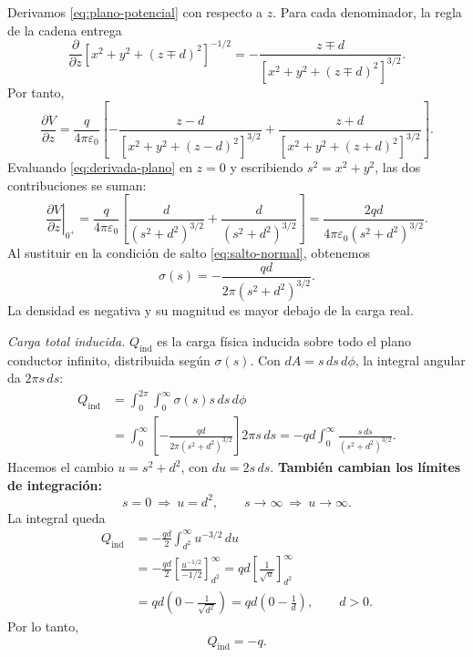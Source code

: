 \documentclass[11pt]{article}
\begin{document}
Derivamos \eqref{eq:plano-potencial} con respecto a $z$. Para cada
denominador, la regla de la cadena entrega
\[
 \frac{\partial}{\partial z}
 [x^2+y^2+(z\mp d)^2]^{-1/2}
 =-\frac{z\mp d}{[x^2+y^2+(z\mp d)^2]^{3/2}}.
\]
Por tanto,
\begin{equation}
 \frac{\partial V}{\partial z}
 =\frac{q}{4\pi\varepsilon_0}
 \left[-\frac{z-d}{[x^2+y^2+(z-d)^2]^{3/2}}
       +\frac{z+d}{[x^2+y^2+(z+d)^2]^{3/2}}\right].
 \label{eq:derivada-plano}
\end{equation}
Evaluando \eqref{eq:derivada-plano} en $z=0$ y escribiendo
$s^2=x^2+y^2$, las dos contribuciones se suman:
\[
 \left.\frac{\partial V}{\partial z}\right|_{0^+}
 =\frac{q}{4\pi\varepsilon_0}
 \left[\frac{d}{(s^2+d^2)^{3/2}}
       +\frac{d}{(s^2+d^2)^{3/2}}\right]
 =\frac{2qd}{4\pi\varepsilon_0(s^2+d^2)^{3/2}}.
\]
Al sustituir en la condición de salto \eqref{eq:salto-normal}, obtenemos
\begin{equation}
 \boxed{\sigma(s)=-\frac{qd}{2\pi(s^2+d^2)^{3/2}}.}
 \label{eq:plano-sigma}
\end{equation}
La densidad es negativa y su magnitud es mayor debajo de la carga real.

\textit{Carga total inducida.} $Q_{\mathrm{ind}}$ es la carga física
inducida sobre todo el plano conductor infinito, distribuida según
$\sigma(s)$. Con $dA=s\,ds\,d\phi$, la integral angular da $2\pi s\,ds$:
\begin{align*}
 Q_{\mathrm{ind}}
 &=\int_0^{2\pi}\!\int_0^\infty\sigma(s)s\,ds\,d\phi\\
 &=\int_0^\infty
   \left[-\frac{qd}{2\pi(s^2+d^2)^{3/2}}\right]2\pi s\,ds
 =-qd\int_0^\infty\frac{s\,ds}{(s^2+d^2)^{3/2}}.
\end{align*}
Hacemos el cambio $u=s^2+d^2$, con $du=2s\,ds$.
\textbf{También cambian los límites de integración:}
\[
 s=0\ \Longrightarrow\ u=d^2,\qquad
 s\to\infty\ \Longrightarrow\ u\to\infty.
\]
La integral queda
\begin{align*}
 Q_{\mathrm{ind}}
 &=-\frac{qd}{2}\int_{d^2}^\infty u^{-3/2}\,du\\
 &=-\frac{qd}{2}
   \left[\frac{u^{-1/2}}{-1/2}\right]_{d^2}^{\infty}
 =qd\left[\frac{1}{\sqrt{u}}\right]_{d^2}^{\infty}\\
 &=qd\left(0-\frac{1}{\sqrt{d^2}}\right)
 =qd\left(0-\frac1d\right),\qquad d>0.
\end{align*}
Por lo tanto,
\begin{equation}
 \boxed{Q_{\mathrm{ind}}=-q.}
 \label{eq:plano-carga-total}
\end{equation}
\end{document}
